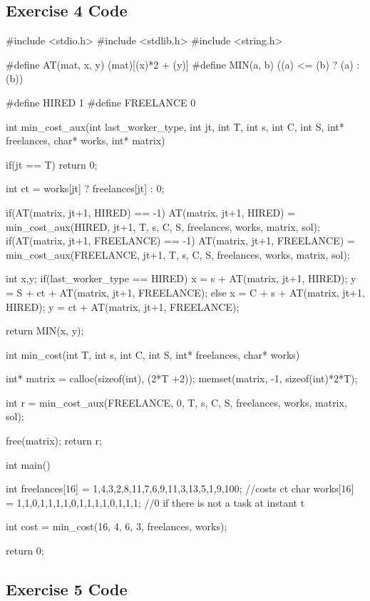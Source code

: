 \documentclass[paper=a4, fontsize=11pt]{scrartcl} %
\numberwithin{equation}{section} %
\numberwithin{figure}{section} %
\numberwithin{table}{section} %
\begin{document}
\subsection*{Exercise 4 Code}

\begin{ccode}
#include <stdio.h>
#include <stdlib.h>
#include <string.h>

#define AT(mat, x, y) (mat)[(x)*2 + (y)]
#define MIN(a, b) ((a) <= (b) ? (a) : (b))

#define HIRED 1
#define FREELANCE 0
 
int min_cost_aux(int last_worker_type, int jt, int T, int s, int C, int S, int* freelances, char* works, int* matrix)
{
  if(jt == T)
    return 0;
  
  int ct = works[jt] ? freelances[jt] : 0;
  
  if(AT(matrix, jt+1, HIRED) == -1)
    AT(matrix, jt+1, HIRED) = min_cost_aux(HIRED, jt+1, T, s, C, S, freelances, works, matrix, sol);
  if(AT(matrix, jt+1, FREELANCE) == -1)
    AT(matrix, jt+1, FREELANCE) = min_cost_aux(FREELANCE, jt+1, T, s, C, S, freelances, works, matrix, sol);
  
  int x,y;
  if(last_worker_type == HIRED) {
    x = s + AT(matrix, jt+1, HIRED);
    y = S + ct + AT(matrix, jt+1, FREELANCE);
  }
  else {
    x = C + s + AT(matrix, jt+1, HIRED);
    y = ct + AT(matrix, jt+1, FREELANCE);
  }
  
  return MIN(x, y);
}

int min_cost(int T, int s, int C, int S, int* freelances, char* works)
{
  int* matrix = calloc(sizeof(int), (2*T +2));
  memset(matrix, -1, sizeof(int)*2*T);
  
  int r = min_cost_aux(FREELANCE, 0, T, s, C, S, freelances, works, matrix, sol);
  
  free(matrix);
  return r;
}

int main()
{
  int freelances[16] = {1,4,3,2,8,11,7,6,9,11,3,13,5,1,9,100}; //costs ct
  char works[16] = {1,1,0,1,1,1,1,0,1,1,1,1,0,1,1,1}; //0 if there is not a task at instant t
  
  int cost = min_cost(16, 4, 6, 3, freelances, works);
  
  return 0;
}
\end{ccode}

\newpage

\subsection*{Exercise 5 Code}
\end{document}
